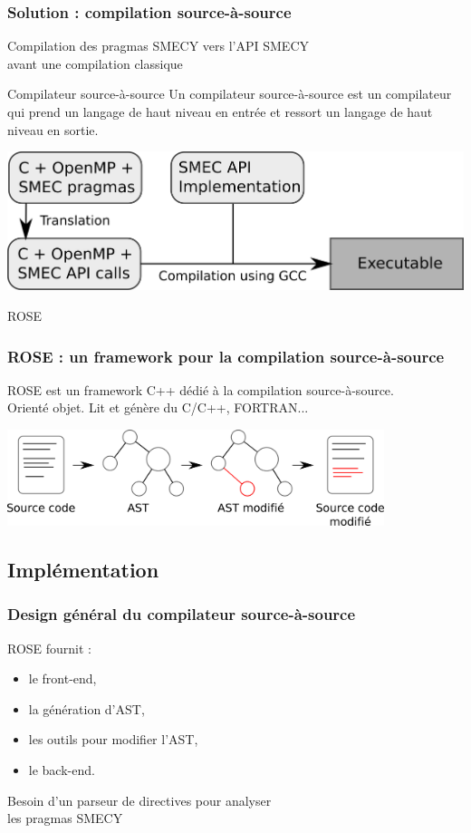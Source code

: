 \documentclass{beamer}
\begin{document}
\begin{frame}
\frametitle{Solution : compilation source-à-source}
\og Compilation \fg{} des pragmas SMECY vers l'API SMECY\\avant une compilation classique
\begin{block}{Compilateur source-à-source}
Un \alert{compilateur source-à-source} est un compilateur qui prend un langage de haut niveau en entrée et ressort un langage de haut niveau en sortie.
\end{block}
\vspace{0.35cm}
\includegraphics{compiler.png}
\end{frame}

\begin{frame}
\begin{block}{ROSE}
\frametitle{ROSE : un framework pour la compilation source-à-source}
\alert{ROSE} est un framework C++ dédié à la compilation source-à-source.\\
Orienté objet.
Lit et génère du C/C++, FORTRAN...
\end{block} \vspace{0.45cm}
\includegraphics[width=11cm]{rose.png}
\end{frame}

\begin{frame}
\subsection{Implémentation}
\frametitle{Design général du compilateur source-à-source}
ROSE fournit :
\begin{itemize}
\item le front-end,
\item la génération d'AST,
\item les outils pour modifier l'AST,
\item le back-end.
\end{itemize}
Besoin d'un \alert{parseur de directives} pour analyser \\les pragmas SMECY
\end{frame}
\end{document}
